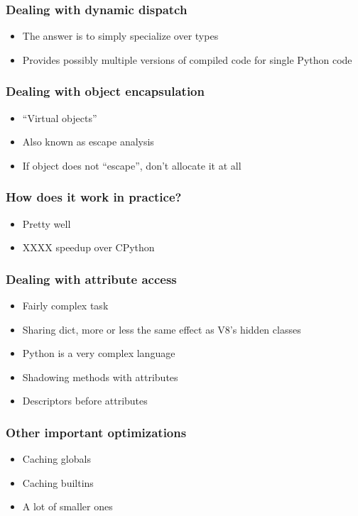 \documentclass[utf8x]{beamer}
\begin{document}
\begin{frame}
  \frametitle{Dealing with dynamic dispatch}
  \begin{itemize}
    \item The answer is to simply specialize over types
    \item Provides possibly multiple versions of compiled code for
      single Python code
  \end{itemize}
\end{frame}

\begin{frame}
  \frametitle{Dealing with object encapsulation}
  \begin{itemize}
    \item ``Virtual objects''
    \item Also known as escape analysis
    \item If object does not ``escape'', don't allocate it at all
  \end{itemize}
\end{frame}

\begin{frame}
  \frametitle{How does it work in practice?}
  \begin{itemize}
    \pause
    \item Pretty well
      \pause
    \item XXXX speedup over CPython
  \end{itemize}
\end{frame}

\begin{frame}
  \frametitle{Dealing with attribute access}
  \begin{itemize}
    \item Fairly complex task
    \item Sharing dict, more or less the same effect as V8's hidden
      classes
      \pause
    \item Python is a very complex language
    \item Shadowing methods with attributes
    \item Descriptors before attributes
  \end{itemize}
\end{frame}

\begin{frame}
  \frametitle{Other important optimizations}
  \begin{itemize}
    \item Caching globals
    \item Caching builtins
    \item A lot of smaller ones
  \end{itemize}
\end{frame}
\end{document}
